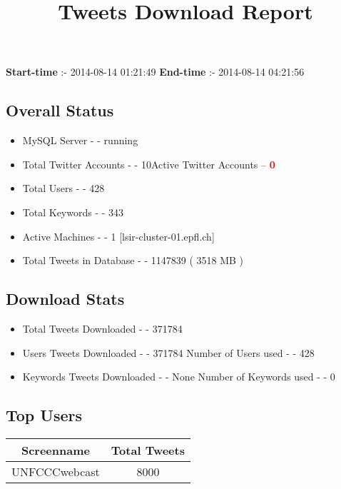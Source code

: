 \documentclass{article}\usepackage[T1]{fontenc}
\begin{document}
\title{\textbf{Tweets Download Report}}
               \date{}
                \maketitle
               \centerline{\textbf{Start-time} :- 2014-08-14 01:21:49 \hspace{40pt} \textbf{End-time} :- 2014-08-14 04:21:56}               \subsection*{Overall Status}                \begin{itemize}                \item MySQL Server - - running               \item Total Twitter Accounts - - 10\newline Active Twitter Accounts -- \textcolor{red}{\textbf{0}}               \item Total Users - - 428               \item Total Keywords - - 343               \item Active Machines - - 1 [lsir-cluster-01.epfl.ch]               \item Total Tweets in Database - - 1147839 ( 3518 MB )               \end{itemize}               \subsection*{Download Stats}                \begin{itemize}                \item Total Tweets Downloaded - - 371784               \item Users Tweets Downloaded - - 371784 \newline Number of Users used - - 428               \item Keywords Tweets Downloaded - - None \newline Number of Keywords used - - 0              \end{itemize}              \subsection*{Top Users}\begin{tabular}{|c|c|}         \hline         Screenname & Total Tweets \\ 
 \hline
UNFCCCwebcast & 8000\\ 

\end{tabular}
\end{document}
